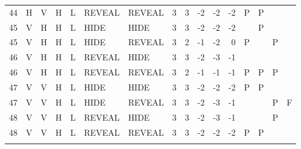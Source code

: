 \begin{longtable}{rllllllrrrrrllll}
  44 & H & V & H & L & REVEAL & REVEAL & 3 & 3 & -2 & -2 & -2 & P & P &  &  \\ 
  45 & V & H & H & L & HIDE & HIDE & 3 & 3 & -2 & -2 & -2 &  & P &  &  \\ 
  45 & V & H & H & L & HIDE & REVEAL & 3 & 2 & -1 & -2 & 0 & P &  & P &  \\ 
  46 & V & H & H & L & REVEAL & HIDE & 3 & 3 & -2 & -3 & -1 &  &  &  &  \\ 
  46 & V & H & H & L & REVEAL & REVEAL & 3 & 2 & -1 & -1 & -1 & P & P & P &  \\ 
  47 & V & V & H & L & HIDE & HIDE & 3 & 3 & -2 & -2 & -2 & P & P &  &  \\ 
  47 & V & V & H & L & HIDE & REVEAL & 3 & 3 & -2 & -3 & -1 &  &  & P & F \\ 
  48 & V & V & H & L & REVEAL & HIDE & 3 & 3 & -2 & -3 & -1 &  &  & P &  \\ 
  48 & V & V & H & L & REVEAL & REVEAL & 3 & 3 & -2 & -2 & -2 & P & P &  &  \\ 
   \hline
\hline
\label{truthtable}
\end{longtable}
\endgroup
